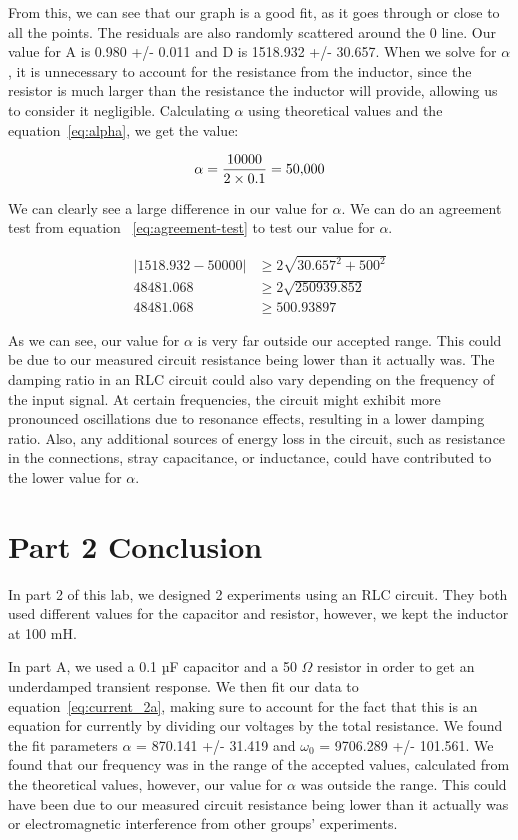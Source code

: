 \documentclass[11pt]{article}
\let\oldsection\section
\renewcommand\section{\clearpage\oldsection}
\begin{document}
    From this, we can see that our graph is a good fit, as it goes through or close to all the points. The residuals are also randomly scattered around the 0 line. Our value for A is 0.980 +/- 0.011 and D is 1518.932 +/- 30.657. When we solve for \( \alpha \), it is unnecessary to account for the resistance from the inductor, since the resistor is much larger than the resistance the inductor will provide, allowing us to consider it negligible. Calculating \( \alpha \) using theoretical values and the equation~\ref{eq:alpha}, we get the value:

    \[
        \alpha = \frac{10000}{2 \times 0.1} \\ = 50{,}000
    \]

    We can clearly see a large difference in our value for \( \alpha \). We can do an agreement test from equation ~\ref{eq:agreement-test} to test our value for \( \alpha \).

    \begin{align*}
        |1518.932 - 50000| &\ge 2 \sqrt{30.657^2 + 500^2} \\
        48481.068 &\ge 2 \sqrt{250939.852} \\
        48481.068 &\ge 500.93897
    \end{align*}

    As we can see, our value for \( \alpha \) is very far outside our accepted range. This could be due to our measured circuit resistance being lower than it actually was. The damping ratio in an RLC circuit could also vary depending on the frequency of the input signal. At certain frequencies, the circuit might exhibit more pronounced oscillations due to resonance effects, resulting in a lower damping ratio. Also, any additional sources of energy loss in the circuit, such as resistance in the connections, stray capacitance, or inductance, could have contributed to the lower value for \( \alpha \).


    \section{Part 2 Conclusion}\label{sec:part2_conclusion}
    In part 2 of this lab, we designed 2 experiments using an RLC circuit. They both used different values for the capacitor and resistor, however, we kept the inductor at 100 mH.

    In part A, we used a  0.1 µF capacitor and a 50 $\Omega$ resistor in order to get an underdamped transient response. We then fit our data to equation~\ref{eq:current_2a}, making sure to account for the fact that this is an equation for currently by dividing our voltages by the total resistance. We found the fit parameters $\alpha$ = 870.141 +/- 31.419 and $\omega_0$ = 9706.289 +/- 101.561. We found that our frequency was in the range of the accepted values, calculated from the theoretical values, however, our value for $\alpha$ was outside the range. This could have been due to our measured circuit resistance being lower than it actually was or electromagnetic interference from other groups’ experiments.
\end{document}

